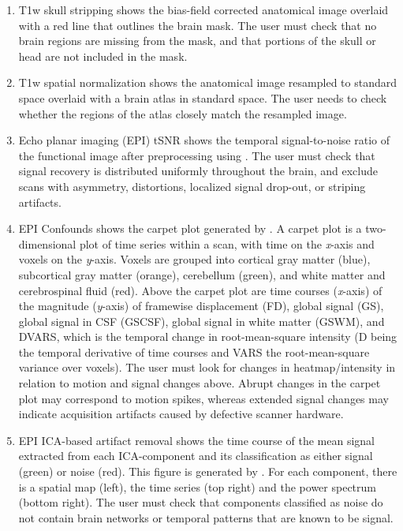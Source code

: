 \begin{enumerate}

\item

T1w skull stripping shows the bias-field corrected anatomical image overlaid with a red line that outlines the brain mask. The user must check that no brain regions are missing from the mask, and that portions of the skull or head are not included in the mask.

\item

T1w spatial normalization shows the anatomical image resampled to standard space overlaid with a brain atlas in standard space. The user needs to check whether the regions of the atlas closely match the resampled image.

\item

Echo planar imaging (EPI) tSNR shows the temporal signal-to-noise ratio of the functional image after preprocessing using . The user must check that signal recovery is distributed uniformly throughout the brain, and exclude scans with asymmetry, distortions, localized signal drop-out, or striping artifacts.

\item

EPI Confounds shows the carpet plot \parencite{power2017,aquino2020} generated by . A carpet plot is a two-dimensional plot of time series within a scan, with time on the \emph{x}-axis and voxels on the \emph{y}-axis. Voxels are grouped into cortical gray matter (blue), subcortical gray matter (orange), cerebellum (green), and white matter and cerebrospinal fluid (red). Above the carpet plot are time courses (\emph{x}-axis) of the magnitude (\emph{y}-axis) of framewise displacement (FD), global signal (GS), global signal in CSF (GSCSF), global signal in white matter (GSWM), and DVARS, which is the temporal change in root-mean-square intensity (D being the temporal derivative of time courses and VARS the root-mean-square variance over voxels). The user must look for changes in heatmap/intensity in relation to motion and signal changes above. Abrupt changes in the carpet plot may correspond to motion spikes, whereas extended signal changes may indicate acquisition artifacts caused by defective scanner hardware.

\item

EPI ICA-based artifact removal shows the time course of the mean signal extracted from each ICA-component and its classification as either signal (green) or noise (red). This figure is generated by . For each component, there is a spatial map (left), the time series (top right) and the power spectrum (bottom right). The user must check that components classified as noise do not contain brain networks or temporal patterns that are known to be signal.


\end{enumerate}
